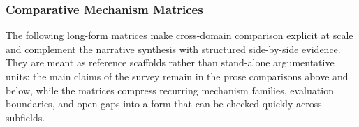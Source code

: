 \documentclass[acmsmall,screen,review]{acmart}
\begin{document}
\subsubsection{Comparative Mechanism Matrices}

The following long-form matrices make cross-domain comparison explicit at scale and complement the narrative synthesis with structured side-by-side evidence. They are meant as reference scaffolds rather than stand-alone argumentative units: the main claims of the survey remain in the prose comparisons above and below, while the matrices compress recurring mechanism families, evaluation boundaries, and open gaps into a form that can be checked quickly across subfields.

\begingroup
\setlength{\tabcolsep}{3pt}
\footnotesize
\renewcommand{\arraystretch}{1.08}
\end{document}

